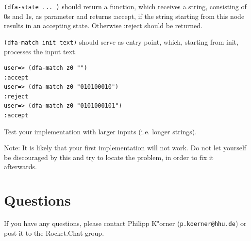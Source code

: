 \documentclass[11pt,a4paper]{article}
\begin{document}
\begin{exercise}[DFA]
\begin{minipage}{.6\textwidth}
\verb|(dfa-state ... )| should return a function,
which receives a string, consisting of 0s and 1s, as parameter and returns :accept,
if the string starting from this node results in an accepting state.
Otherwise :reject should be returned.
\end{minipage}

\verb|(dfa-match init text)| should serve as entry point, which, starting from init, processes the input text.

\begin{verbatim}
user=> (dfa-match z0 "")
:accept
user=> (dfa-match z0 "010100010")
:reject
user=> (dfa-match z0 "0101000101")
:accept
\end{verbatim}


Test your implementation with larger inputs (i.e. longer strings).

Note: It is likely that your first implementation will not work.
Do not let yourself be discouraged by this and try to locate the problem,
in order to fix it afterwards.

\end{exercise}


	\section*{Questions}
	If you have any questions, please contact Philipp K"orner (\texttt{p.koerner@hhu.de}) or post it to the Rocket.Chat group.
\end{document}
